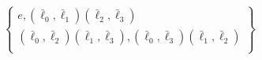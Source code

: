 \documentclass[preview]{standalone}
\begin{document}
\begin{align*}
\begin{Bmatrix}    e,(\bar{\ell}_0,\bar{\ell}_1)(\bar{\ell}_2,\bar{\ell}_3)\\    (\bar{\ell}_0,\bar{\ell}_2)(\bar{\ell}_1,\bar{\ell}_3),(\bar{\ell}_0,\bar{\ell}_3)(\bar{\ell}_1,\bar{\ell}_2)\\\end{Bmatrix}
\end{align*}
\end{document}
